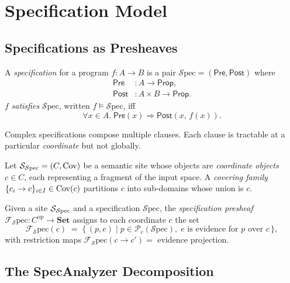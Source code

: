 \documentclass[11pt]{article}
\newcommand{\Spec}{\mathcal{S}\mathrm{pec}}        %
\newcommand{\Pre}{\ensuremath{\mathsf{Pre}}}                     %
\newcommand{\Post}{\ensuremath{\mathsf{Post}}}                   %
\newcommand{\Props}{\mathcal{P}}                    %
\newcommand{\CoordProps}[1]{\Props_{#1}}            %
\newcommand{\SatSite}{{\Site_{\Spec}}}                %
\begin{document}
\section{Specification Model}\label{sec:specmodel}

\subsection{Specifications as Presheaves}\label{sec:spec-presheaf}

\begin{definition}[Specification]\label{def:spec}
A \emph{specification} for a program $f : A \to B$ is a pair
$\Spec = (\Pre, \Post)$ where
\begin{align*}
  \Pre  &: A \to \mathsf{Prop}, \\
  \Post &: A \times B \to \mathsf{Prop}.
\end{align*}
$f$ \emph{satisfies} $\Spec$, written $f \models \Spec$, iff
\[
  \forall x \in A.\; \Pre(x) \Rightarrow \Post(x,\, f(x)).
\]
\end{definition}

Complex specifications compose multiple clauses.  Each clause is
tractable at a particular \emph{coordinate} but not globally.

\begin{definition}\label{def:coord-system}
Let $\SatSite = (C, \Cov)$ be a semantic site whose objects are
\emph{coordinate objects} $c \in C$, each representing a fragment
of the input space.  A \emph{covering family}
$\{c_i \to c\}_{i \in I} \in \mathrm{Cov}(c)$ partitions $c$ into
sub-domains whose union is $c$.
\end{definition}

\begin{definition}\label{def:spec-presheaf}
Given a site $\SatSite$ and a specification $\Spec$, the
\emph{specification presheaf}
$\mathcal{F}_\Spec : C^{\mathrm{op}} \to \mathbf{Set}$
assigns to each coordinate $c$ the set
\[
  \mathcal{F}_\Spec(c) \;=\;
  \bigl\{\, (p, e) \;\big|\;
    p \in \CoordProps{c}(\Spec),\;
    e \text{ is evidence for } p \text{ over } c
  \,\bigr\},
\]
with restriction maps $\mathcal{F}_\Spec(c \to c') = $ evidence projection.
\end{definition}

\subsection{The SpecAnalyzer Decomposition}\label{sec:specanalyzer}
\end{document}
